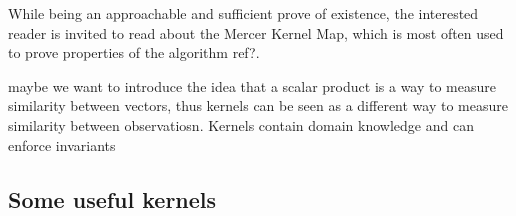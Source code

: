 While being an approachable and sufficient prove of existence, the interested reader is invited to read about the Mercer Kernel Map, which is most often used to prove properties of the algorithm \textcolor[rgb]{1,0,0}{ref?}.







 \textcolor[rgb]{1,0,0}{ maybe we want to introduce the idea that a scalar product is a way to measure similarity between vectors, thus kernels can be seen as a different way to measure similarity between observatiosn. Kernels contain domain knowledge and can enforce invariants }


\subsection {Some useful kernels}

